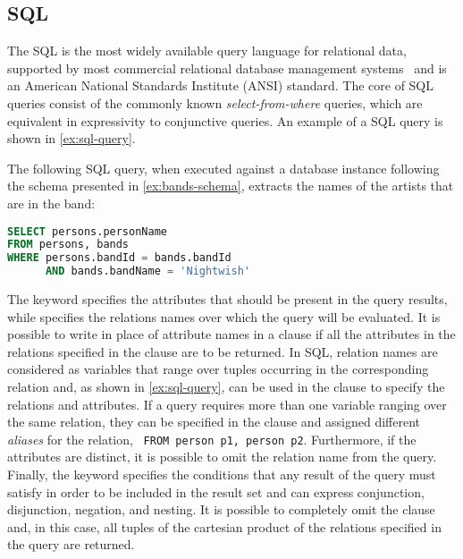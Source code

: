 \subsection{SQL}
\label{sec:sql}

The \ac{SQL} is the most widely available query language for relational data, supported by most commercial relational
database management systems~\cite{AbiteboulHullVianu:1995aa} and is an American National Standards Institute (ANSI)
standard.
%
The core of SQL queries consist of the commonly known \emph{select-from-where} queries, which are equivalent in
expressivity to conjunctive queries.  An example of a \ac{SQL} query is shown in \cref{ex:sql-query}.
%
\begin{example}
  \label{ex:sql-query}
  The following \ac{SQL} query, when executed against a database instance following the schema presented in
  \cref{ex:bands-schema}, extracts the names of the artists that are in the  band:
\begin{lstlisting}[language=SQL,frame=none,numbers=none]
SELECT persons.personName
FROM persons, bands
WHERE persons.bandId = bands.bandId
      AND bands.bandName = 'Nightwish'
\end{lstlisting}
\end{example}
%
The \SELECT keyword specifies the attributes that should be present in the query results, while \FROM specifies the
relations names over which the query will be evaluated.  It is possible to write \character{*} in place of attribute
names in a \SELECT clause if all the attributes in the relations specified in the \FROM clause are to be returned.
%
In SQL, relation names are considered as variables that range over tuples occurring in the corresponding relation and,
as shown in \cref{ex:sql-query}, can be used in the \WHERE clause to specify the relations and attributes.
%
If a query requires more than one variable ranging over the same relation, they can be specified in the \FROM clause and
assigned different \emph{aliases} for the relation, \eg~\lstinline{FROM person p1, person p2}.  Furthermore, if the
attributes are distinct, it is possible to omit the relation name from the \SELECT query.
%
Finally, the \WHERE keyword specifies the conditions that any result of the query must satisfy in order to be included
in the result set and can express conjunction, disjunction, negation, and nesting.  It is possible to completely omit
the \WHERE clause and, in this case, all tuples of the cartesian product of the relations specified in the query are
returned.


